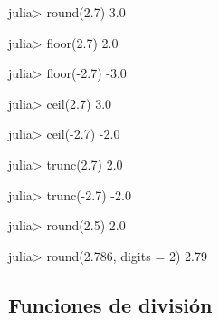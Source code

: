 \documentclass[
  letterpaper,
  DIV=11,
  numbers=noendperiod]{scrreprt}
\newenvironment{Shaded}{\begin{snugshade}}{\end{snugshade}}
\newcommand{\FloatTok}[1]{\textcolor[rgb]{0.68,0.00,0.00}{#1}}
\newcommand{\FunctionTok}[1]{\textcolor[rgb]{0.28,0.35,0.67}{#1}}
\newcommand{\NormalTok}[1]{\textcolor[rgb]{0.00,0.23,0.31}{#1}}
\newcommand{\OperatorTok}[1]{\textcolor[rgb]{0.37,0.37,0.37}{#1}}
\begin{document}
\begin{Shaded}
\begin{Highlighting}[]
\NormalTok{julia}\OperatorTok{\textgreater{}} \FunctionTok{round}\NormalTok{(}\FloatTok{2.7}\NormalTok{)}
\FloatTok{3.0}

\NormalTok{julia}\OperatorTok{\textgreater{}} \FunctionTok{floor}\NormalTok{(}\FloatTok{2.7}\NormalTok{)}
\FloatTok{2.0}

\NormalTok{julia}\OperatorTok{\textgreater{}} \FunctionTok{floor}\NormalTok{(}\OperatorTok{{-}}\FloatTok{2.7}\NormalTok{)}
\OperatorTok{{-}}\FloatTok{3.0}

\NormalTok{julia}\OperatorTok{\textgreater{}} \FunctionTok{ceil}\NormalTok{(}\FloatTok{2.7}\NormalTok{)}
\FloatTok{3.0}

\NormalTok{julia}\OperatorTok{\textgreater{}} \FunctionTok{ceil}\NormalTok{(}\OperatorTok{{-}}\FloatTok{2.7}\NormalTok{)}
\OperatorTok{{-}}\FloatTok{2.0}

\NormalTok{julia}\OperatorTok{\textgreater{}} \FunctionTok{trunc}\NormalTok{(}\FloatTok{2.7}\NormalTok{)}
\FloatTok{2.0}

\NormalTok{julia}\OperatorTok{\textgreater{}} \FunctionTok{trunc}\NormalTok{(}\OperatorTok{{-}}\FloatTok{2.7}\NormalTok{)}
\OperatorTok{{-}}\FloatTok{2.0}

\NormalTok{julia}\OperatorTok{\textgreater{}} \FunctionTok{round}\NormalTok{(}\FloatTok{2.5}\NormalTok{)}
\FloatTok{2.0}

\NormalTok{julia}\OperatorTok{\textgreater{}} \FunctionTok{round}\NormalTok{(}\FloatTok{2.786}\NormalTok{, digits }\OperatorTok{=} \FloatTok{2}\NormalTok{)}
\FloatTok{2.79}
\end{Highlighting}
\end{Shaded}

\hypertarget{funciones-de-divisiuxf3n}{%
\subsection{Funciones de división}\label{funciones-de-divisiuxf3n}}
\end{document}
